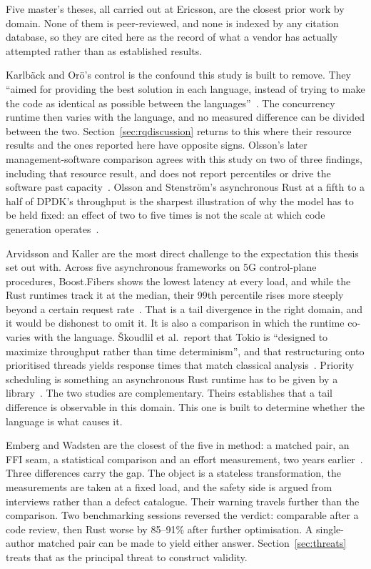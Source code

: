 \documentclass[english,oneside,a4paper,censored,csm,software-track-2020]{HYthesisML}
\begin{document}
Five master's theses, all carried out at Ericsson, are the closest prior work by domain.
None of them is peer-reviewed, and none is indexed by any citation database, so they are cited
here as the record of what a vendor has actually attempted rather than as established results.

Karlb\"ack and Or\"o's control is the confound this study is built to remove. They ``aimed for
providing the best solution in each language, instead of trying to make the code as identical as
possible between the languages''~\cite{karlback2021ran}. The concurrency runtime then varies
with the language, and no measured difference can be divided between the two.
Section~\ref{sec:rqdiscussion} returns to this where their resource results and the ones reported
here have opposite signs. Olsson's later management-software comparison agrees with this study
on two of three findings, including that resource result, and does not report percentiles or
drive the software past capacity~\cite{olsson2023ranmgmt}. Olsson and Stenstr\"om's asynchronous
Rust at a fifth to a half of DPDK's throughput is the sharpest illustration of why the model has
to be held fixed: an effect of two to five times is not the scale at which code generation
operates~\cite{olsson2023asyncpackets}.

Arvidsson and Kaller are the most direct challenge to the expectation this thesis set out with.
Across five asynchronous frameworks on 5G control-plane procedures, Boost.Fibers shows the
lowest latency at every load, and while the Rust runtimes track it at the median, their 99th
percentile rises more steeply beyond a certain request rate~\cite{arvidsson2025async}. That is
a tail divergence in the right domain, and it would be dishonest to omit it. It is also a
comparison in which the runtime co-varies with the language. \v{S}koudlil et al.\ report that
Tokio is ``designed to maximize throughput rather than time determinism'', and that
restructuring onto prioritised threads yields response times that match classical
analysis~\cite{skoudlil2025asyncrust}. Priority scheduling is something an asynchronous Rust runtime
has to be given by a library~\cite{zhuang2026flowprioritize}. The two studies are complementary.
Theirs establishes that a tail difference is observable in this domain. This one is built to
determine whether the language is what causes it.

Emberg and Wadsten are the closest of the five in method: a matched pair, an FFI seam, a
statistical comparison and an effort measurement, two years earlier~\cite{emberg2023asn1}.
Three differences carry the gap. The object is a stateless transformation, the measurements are
taken at a fixed load, and the safety side is argued from interviews rather than a defect
catalogue. Their warning travels further than the comparison. Two benchmarking sessions reversed
the verdict: comparable after a code review, then Rust worse by 85--91\% after further
optimisation. A single-author matched pair can be made to yield either answer.
Section~\ref{sec:threats} treats that as the principal threat to construct validity.
\end{document}
